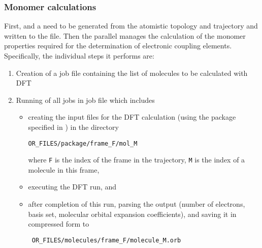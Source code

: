 \subsubsection{Monomer calculations}
\label{sec:edft}
First,  and a  need to be generated from the atomistic topology and trajectory and written to the \sqlstate file. Then the parallel  \calculator manages the calculation of the monomer properties required for the determination of electronic coupling elements. Specifically, the individual steps it performs are:
%
\begin{enumerate}
\item Creation of a job file containing the list of molecules to be calculated with DFT 
\item Running of all jobs in job file 
which includes
\begin{itemize}
\item creating the input files for the DFT calculation (using the package specified in \xmloptions) in the directory 
\begin{verbatim}
OR_FILES/package/frame_F/mol_M
\end{verbatim}
where {\tt F} is the index of the frame in the trajectory, {\tt M} is the index of a molecule in this frame,
\item executing the DFT run, and
\item after completion of this run, parsing the output (number of electrons, basis set, molecular orbital expansion coefficients), and saving it in compressed form to 
\begin{verbatim}
 OR_FILES/molecules/frame_F/molecule_M.orb 
\end{verbatim}
\end{itemize}
\end{enumerate}


